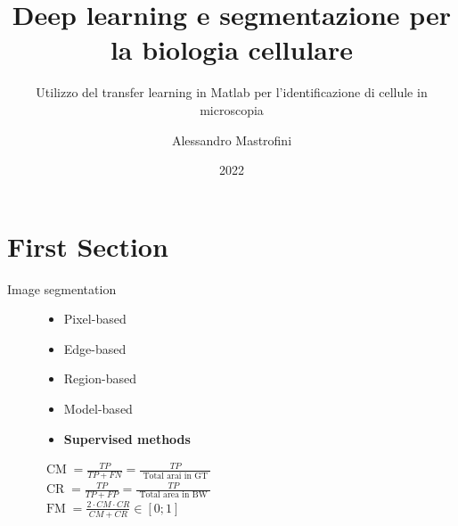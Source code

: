 \documentclass[aspectratio=169,xcolor=dvipsnames]{beamer}
\title[short title]{Deep learning e segmentazione per la biologia cellulare} %
\subtitle{Utilizzo del transfer learning in Matlab per l'identificazione di cellule in microscopia}
\author[Pin-Yen] {Alessandro Mastrofini}
\institute[NTU] %
{
Elaborazione di Immagini \\
Università degli Studi di Roma Tor Vergata%
}
\date{2022} %
\begin{document}
\begin{frame}
    \titlepage
\end{frame}

\section{First Section}

\begin{frame}{Image segmentation}
	\begin{figure}
	\centering
\begin{minipage}{0.5\linewidth}
\begin{itemize}
	\item Pixel-based
	\item Edge-based
	\item Region-based
	\item Model-based
	\item \textbf{Supervised methods}
\end{itemize}
\vspace{0.1\linewidth}

\small{$\operatorname{CM}=\frac{T P}{T P+F N}=\frac{T P}{\text { Total arai in GT }}$}\\


\small{$
\operatorname{CR}=\frac{TP}{T P+F P}=\frac{TP}{\text { Total area in BW }}$}\\


\small{$
\operatorname{FM}=\frac{2 \cdot CM \cdot C R}{C M+C R} \in[0 ; 1]
$}

\end{minipage}
\begin{minipage}{0.35\linewidth}
\tiny{\def\svgwidth{\linewidth}
 }
\end{minipage}
\end{figure}
\end{frame}
\end{document}
